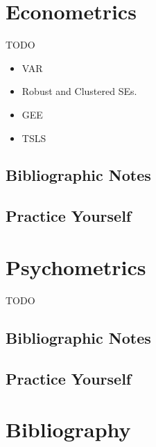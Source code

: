 \documentclass[]{book}
\providecommand{\tightlist}{%
  \setlength{\itemsep}{0pt}\setlength{\parskip}{0pt}}
\theoremstyle{definition}
\theoremstyle{definition}
\theoremstyle{definition}
\theoremstyle{remark}
\begin{document}
\chapter{Econometrics}\label{econometrics}

TODO

\begin{itemize}
\tightlist
\item
  VAR
\item
  Robust and Clustered SEs.
\item
  GEE
\item
  TSLS
\end{itemize}

\section{Bibliographic Notes}\label{bibliographic-notes-18}

\section{Practice Yourself}\label{practice-yourself-19}

\chapter{Psychometrics}\label{psychometrics}

TODO

\section{Bibliographic Notes}\label{bibliographic-notes-19}

\section{Practice Yourself}\label{practice-yourself-20}

\chapter{Bibliography}\label{bib}


\end{document}
